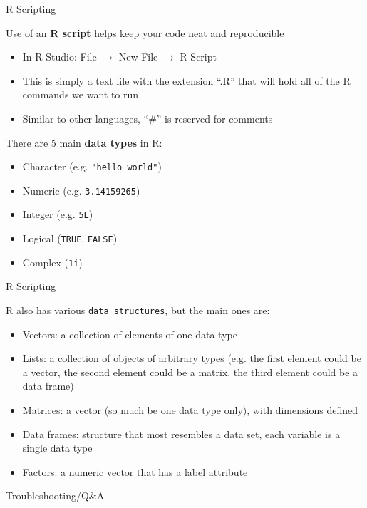 \documentclass[svgnames,smaller]{beamer}\usepackage[]{graphicx}\usepackage[]{color}
\begin{document}

\begin{frame}{R Scripting}

Use of an \textbf{R script} helps keep your code neat and reproducible
\begin{itemize}
    \item In R Studio: File $\rightarrow$ New File $\rightarrow$ R Script
    \item This is simply a text file with the extension ``.R'' that will hold all of the R commands we want to run
    \item Similar to other languages, ``\#'' is reserved for comments
\end{itemize}

There are 5 main \textbf{data types} in R:
\begin{itemize}
    \item Character (e.g. \texttt{"hello world"})
    \item Numeric (e.g. \texttt{3.14159265})
    \item Integer (e.g. \texttt{5L})
    \item Logical (\texttt{TRUE}, \texttt{FALSE})
    \item Complex (\texttt{1i})
\end{itemize}

\end{frame}


\begin{frame}{R Scripting}

R also has various \texttt{data structures}, but the main ones are:
\begin{itemize}
    \item Vectors: a collection of elements of one data type
    \item Lists: a collection of objects of arbitrary types (e.g. the first element could be a vector, the second element could be a matrix, the third element could be a data frame)
    \item Matrices: a vector (so much be one data type only), with dimensions defined
    \item Data frames: structure that most resembles a data set, each variable is a single data type
    \item Factors: a numeric vector that has a label attribute
\end{itemize}

\end{frame}




\begin{frame}{Troubleshooting/Q\&A}



\end{frame}
\end{document}
